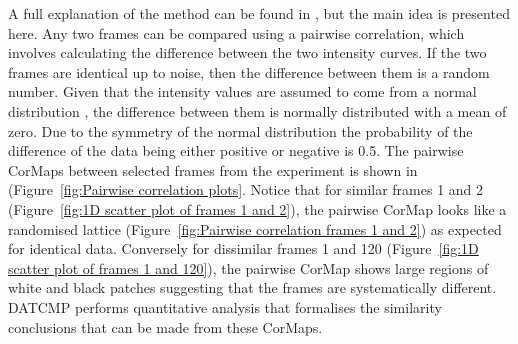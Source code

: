 A full explanation of the method can be found in \cite{franke2015correlation}, but the main idea is presented here.
Any two frames can be compared using a pairwise correlation, which involves calculating the difference between the two intensity curves.
If the two frames are identical up to noise, then the difference between them is a random number.
Given that the intensity values are assumed to come from a normal distribution \cite{franke2015correlation}, the difference between them is normally distributed with a mean of zero.
Due to the symmetry of the normal distribution the probability of the difference of the data being either positive or negative is 0.5.
The pairwise CorMaps between selected frames from the experiment is shown in (Figure~\ref{fig:Pairwise correlation plots}.
Notice that for similar frames 1 and 2 (Figure~\ref{fig:1D scatter plot of frames 1 and 2}), the pairwise CorMap looks like a randomised lattice (Figure~\ref{fig:Pairwise correlation frames 1 and 2}) as expected for identical data.
Conversely for dissimilar frames 1 and 120 (Figure~\ref{fig:1D scatter plot of frames 1 and 120}), the pairwise CorMap shows large regions of white and black patches suggesting that the frames are systematically different.
DATCMP performs quantitative analysis that formalises the similarity conclusions that can be made from these CorMaps.
